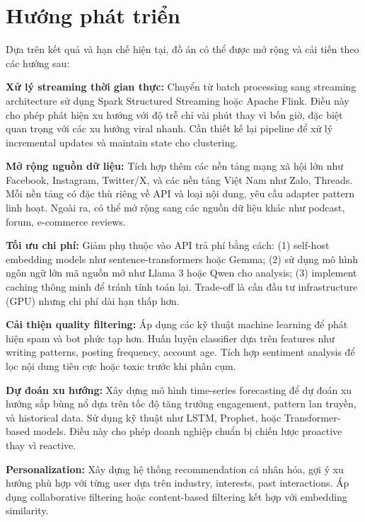 
\chapter{Hướng phát triển}

Dựa trên kết quả và hạn chế hiện tại, đồ án có thể được mở rộng và cải tiến theo các hướng sau:

\textbf{Xử lý streaming thời gian thực:} Chuyển từ batch processing sang streaming architecture sử dụng Spark Structured Streaming hoặc Apache Flink. Điều này cho phép phát hiện xu hướng với độ trễ chỉ vài phút thay vì bốn giờ, đặc biệt quan trọng với các xu hướng viral nhanh. Cần thiết kế lại pipeline để xử lý incremental updates và maintain state cho clustering.

\textbf{Mở rộng nguồn dữ liệu:} Tích hợp thêm các nền tảng mạng xã hội lớn như Facebook, Instagram, Twitter/X, và các nền tảng Việt Nam như Zalo, Threads. Mỗi nền tảng có đặc thù riêng về API và loại nội dung, yêu cầu adapter pattern linh hoạt. Ngoài ra, có thể mở rộng sang các nguồn dữ liệu khác như podcast, forum, e-commerce reviews.

\textbf{Tối ưu chi phí:} Giảm phụ thuộc vào API trả phí bằng cách: (1) self-host embedding models như sentence-transformers hoặc Gemma; (2) sử dụng mô hình ngôn ngữ lớn mã nguồn mở như Llama 3 hoặc Qwen cho analysis; (3) implement caching thông minh để tránh tính toán lại. Trade-off là cần đầu tư infrastructure (GPU) nhưng chi phí dài hạn thấp hơn.

\textbf{Cải thiện quality filtering:} Áp dụng các kỹ thuật machine learning để phát hiện spam và bot phức tạp hơn. Huấn luyện classifier dựa trên features như writing patterns, posting frequency, account age. Tích hợp sentiment analysis để lọc nội dung tiêu cực hoặc toxic trước khi phân cụm.

\textbf{Dự đoán xu hướng:} Xây dựng mô hình time-series forecasting để dự đoán xu hướng sắp bùng nổ dựa trên tốc độ tăng trưởng engagement, pattern lan truyền, và historical data. Sử dụng kỹ thuật như LSTM, Prophet, hoặc Transformer-based models. Điều này cho phép doanh nghiệp chuẩn bị chiến lược proactive thay vì reactive.

\textbf{Personalization:} Xây dựng hệ thống recommendation cá nhân hóa, gợi ý xu hướng phù hợp với từng user dựa trên industry, interests, past interactions. Áp dụng collaborative filtering hoặc content-based filtering kết hợp với embedding similarity.

